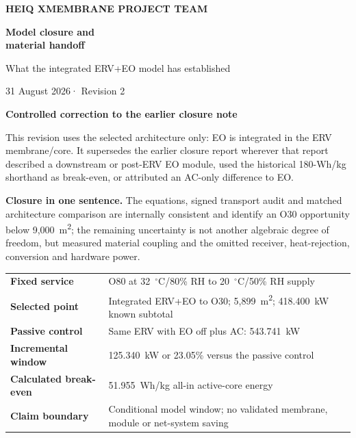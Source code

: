 \documentclass[10pt,a4paper]{article}
\newcommand{\sans}{\fontfamily{qhv}\selectfont}
\begin{document}
\thispagestyle{empty}
\vspace*{8mm}
\begin{tcolorbox}[enhanced,colback=Navy,colframe=Navy,boxrule=0pt,arc=0mm,left=12mm,right=12mm,top=12mm,bottom=12mm]
{\sans\bfseries\large\color{white}HEIQ XMEMBRANE PROJECT TEAM}\par
\vspace{8mm}
{\sans\bfseries\fontsize{28}{32}\selectfont\color{white}Model closure and\\[-1mm]material handoff}\par
\vspace{2mm}
{\sans\fontsize{18}{21}\selectfont\color{white}What the integrated ERV+EO model has established}\par
\vspace{7mm}
{\sans\large\color{white}31 August 2026\quad · \quad Revision 2}
\end{tcolorbox}

\vspace{10mm}
{\sans\bfseries\Large\color{Navy}Controlled correction to the earlier closure note}\par
\vspace{4mm}
This revision uses the selected architecture only: EO is integrated in the
ERV membrane/core. It supersedes the earlier closure report wherever that
report described a downstream or post-ERV EO module, used the historical
180-Wh/kg shorthand as break-even, or attributed an AC-only difference to EO.

\begin{mainbox}
\textbf{Closure in one sentence.} The equations, signed transport audit and
matched architecture comparison are internally consistent and identify an
O30 opportunity below 9,000~m\textsuperscript{2}; the remaining uncertainty is
not another algebraic degree of freedom, but measured material coupling and
the omitted receiver, heat-rejection, conversion and hardware power.
\end{mainbox}

\vfill
\begin{tabularx}{\textwidth}{@{}lY@{}}
\textbf{Fixed service} & O80 at 32~$^\circ$C/80\% RH to 20~$^\circ$C/50\% RH supply \\
\textbf{Selected point} & Integrated ERV+EO to O30; 5,899~m\textsuperscript{2}; 418.400~kW known subtotal \\
\textbf{Passive control} & Same ERV with EO off plus AC: 543.741~kW \\
\textbf{Incremental window} & 125.340~kW or 23.05\% versus the passive control \\
\textbf{Calculated break-even} & 51.955~Wh/kg all-in active-core energy \\
\textbf{Claim boundary} & Conditional model window; no validated membrane, module or net-system saving \\
\end{tabularx}
\end{document}
